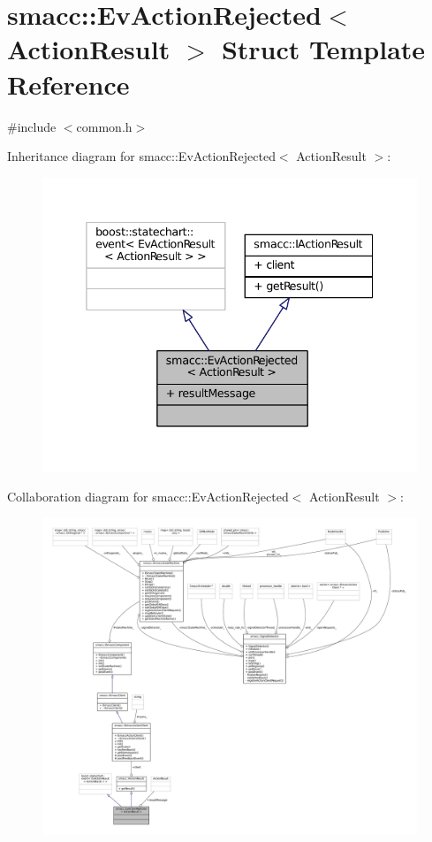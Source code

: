 \hypertarget{structsmacc_1_1EvActionRejected}{}\section{smacc\+:\+:Ev\+Action\+Rejected$<$ Action\+Result $>$ Struct Template Reference}
\label{structsmacc_1_1EvActionRejected}


{\ttfamily \#include $<$common.\+h$>$}



Inheritance diagram for smacc\+:\+:Ev\+Action\+Rejected$<$ Action\+Result $>$\+:
\nopagebreak
\begin{figure}[H]
\begin{center}
\leavevmode
\includegraphics[width=338pt]{structsmacc_1_1EvActionRejected__inherit__graph}
\end{center}
\end{figure}


Collaboration diagram for smacc\+:\+:Ev\+Action\+Rejected$<$ Action\+Result $>$\+:
\nopagebreak
\begin{figure}[H]
\begin{center}
\leavevmode
\includegraphics[width=350pt]{structsmacc_1_1EvActionRejected__coll__graph}
\end{center}
\end{figure}
